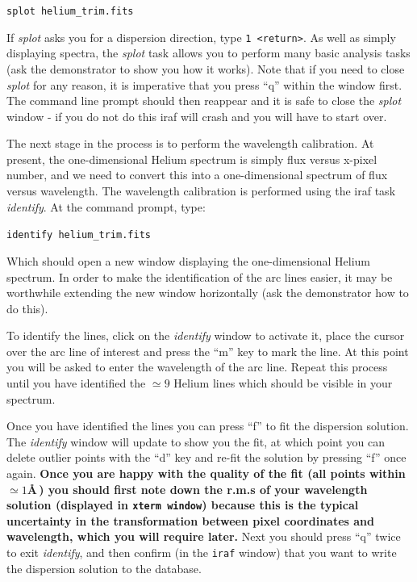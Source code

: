 \documentclass[12pt]{article}
\begin{document}
{\tt splot helium\verb,_trim,.fits}

If {\it splot} asks you for a dispersion direction, type {\tt 1
  <return>}. As well as simply displaying spectra, the {\it splot} task allows you
to perform many basic analysis tasks (ask the demonstrator to show you
how it works).  Note that if you need to close {\it splot} for any reason,
it is imperative that you press ``q'' within the window first. The command
line prompt should then reappear and it is safe to close the {\it splot} window - 
if you do not do this {\sc iraf} will crash and you will have to start over.

The next stage in the process is to perform the wavelength
calibration. At present, the one-dimensional Helium spectrum is 
simply flux versus x-pixel number, and we need to convert this into a 
one-dimensional spectrum of flux versus wavelength. The wavelength
calibration is performed using the {\sc iraf} task {\it identify}. 
At the command prompt, type:

{\tt identify helium\verb,_trim.fits,}

Which should open a new window displaying the one-dimensional Helium
spectrum. In order to make the identification of the arc lines easier, it
may be worthwhile extending the new window horizontally (ask the
demonstrator how to do this).

To identify the lines, click on the {\it identify} window to activate
it, place the cursor over the arc line of interest and press the ``m''
key to mark the line. At this point you will be asked to enter the
wavelength of the arc line. Repeat this process
until you have identified the $\simeq 9$ Helium lines which should be
visible in your spectrum. 

\noindent
Once you have
identified the lines you can press ``f'' to fit the dispersion
solution. The {\it identify} window will update to show you the fit,
at which point you can delete outlier points with the ``d'' key and
re-fit the solution by pressing ``f'' once again. {\bf Once you are happy
with the quality of the fit (all points within $\simeq1$\AA\,) you
should first note down the r.m.s of your wavelength solution (displayed in
{\tt xterm window}) because this is the typical uncertainty in the 
transformation between pixel coordinates and wavelength, which you will require later.}
Next you should press ``q'' twice to exit {\it identify}, and then
confirm (in the {\tt iraf} window) that you want to write the dispersion solution to the database. 
\end{document}
